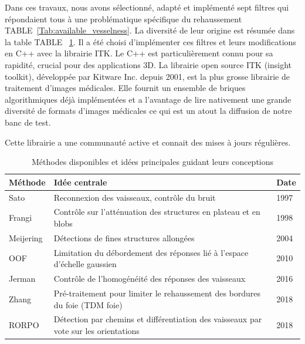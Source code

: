 Dans ces travaux, nous avons sélectionné, adapté et implémenté sept filtres qui répondaient tous à une problématique spécifique du rehaussement TABLE~\ref{Tab:available_vesselness}. La diversité de leur origine est résumée dans la table TABLE~ \ref{Tab:origins_vesselness}. Il a été choisi d'implémenter ces filtres et leurs modifications en C++ avec la librairie ITK. Le C++ est particulièrement connu pour sa rapidité, crucial pour des applications 3D. La librairie open source ITK (insight toolkit), développée par Kitware Inc. depuis 2001, est la plus grosse librairie de traitement d'images médicales. Elle fournit un ensemble de briques algorithmiques déjà implémentées et a l'avantage de lire nativement une grande diversité de formats d'images médicales ce qui est un atout la diffusion de notre banc de test.

Cette librairie a une communauté active et connait des mises à jours régulières.

\begin{table}
    \begin{center}
  \begin{tabular}{l|l|l}
  Méthode   &  Idée centrale                                                                       & Date \\ \hline  \hline 
  Sato      & Reconnexion des vaisseaux, contrôle du bruit                                         & 1997 \\ \hline
  Frangi    & Contrôle sur l'atténuation des structures en plateau et en blobs                     & 1998 \\ \hline
  Meijering & Détections de fines structures allongées                                             & 2004 \\ \hline
  OOF       & Limitation du débordement des réponses lié à l'espace d'échelle gaussien             & 2010 \\ \hline
  Jerman    & Contrôle de l'homogénéité des réponses des vaisseaux                                 & 2016 \\ \hline
  Zhang     & Pré-traitement pour limiter le rehaussement des bordures du foie (TDM foie)          & 2018 \\ \hline
  RORPO     & Détection par chemins et différentiation des vaisseaux par vote sur les orientations & 2018  
  \end{tabular}
  \end{center}
  \caption{Méthodes disponibles et idées principales guidant leurs conceptions}
  \label{Tab:origins_vesselness}
  \end{table}

